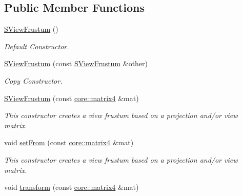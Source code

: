 \subsection*{Public Member Functions}
\begin{DoxyCompactItemize}
\item 
\mbox{\label{structirr_1_1scene_1_1SViewFrustum_a7052e88c612bd1239115929e94e6210d}} 
\hyperlink{structirr_1_1scene_1_1SViewFrustum_a7052e88c612bd1239115929e94e6210d}{S\+View\+Frustum} ()
\begin{DoxyCompactList}\small\item\em Default Constructor. \end{DoxyCompactList}\item 
\hyperlink{structirr_1_1scene_1_1SViewFrustum_aa7cfed3ee9feee79efe02d26f3b14b0c}{S\+View\+Frustum} (const \hyperlink{structirr_1_1scene_1_1SViewFrustum}{S\+View\+Frustum} \&other)
\begin{DoxyCompactList}\small\item\em Copy Constructor. \end{DoxyCompactList}\item 
\mbox{\label{structirr_1_1scene_1_1SViewFrustum_acfcbb01f1e26f73ee1d9c7695302a508}} 
\hyperlink{structirr_1_1scene_1_1SViewFrustum_acfcbb01f1e26f73ee1d9c7695302a508}{S\+View\+Frustum} (const \hyperlink{namespaceirr_1_1core_a73fa92e638c5ca97efd72da307cc9b65}{core\+::matrix4} \&mat)
\begin{DoxyCompactList}\small\item\em This constructor creates a view frustum based on a projection and/or view matrix. \end{DoxyCompactList}\item 
\mbox{\label{structirr_1_1scene_1_1SViewFrustum_a2517bde9292aa26119d75b9ff0b92833}} 
void \hyperlink{structirr_1_1scene_1_1SViewFrustum_a2517bde9292aa26119d75b9ff0b92833}{set\+From} (const \hyperlink{namespaceirr_1_1core_a73fa92e638c5ca97efd72da307cc9b65}{core\+::matrix4} \&mat)
\begin{DoxyCompactList}\small\item\em This constructor creates a view frustum based on a projection and/or view matrix. \end{DoxyCompactList}\item 
void \hyperlink{structirr_1_1scene_1_1SViewFrustum_aeabadaf532f08ba3cb98b897ff0619f2}{transform} (const \hyperlink{namespaceirr_1_1core_a73fa92e638c5ca97efd72da307cc9b65}{core\+::matrix4} \&mat)

\end{DoxyCompactItemize}
